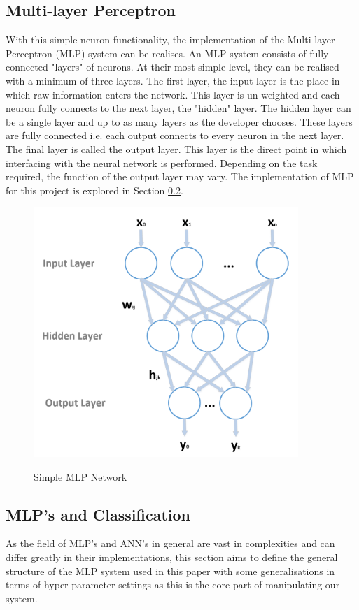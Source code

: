 \documentclass[11pt]{article}
\begin{document}
	\subsection{Multi-layer Perceptron}
	With this simple neuron functionality, the implementation of the Multi-layer Perceptron (MLP) system can be realises. An MLP system consists of fully connected "layers" of neurons. At their most simple level, they can be realised with a minimum of three layers. The first layer, the input layer is the place in which raw information enters the network. This layer is un-weighted and each neuron fully connects to the next layer, the "hidden" layer. The hidden layer can be a single layer and up to as many layers as the developer chooses. These layers are fully connected i.e. each output connects to every neuron in the next layer. The final layer is called the output layer. This layer is the direct point in which interfacing with the neural network is performed. Depending on the task required, the function of the output layer may vary. The implementation of MLP for this project is explored in Section \ref{sec:mlp_class}.
	
	\begin{figure}[H]
		\centering
		\includegraphics[width=10cm]{Figures/mlp}
		\caption{Simple MLP Network}\cite{Bonaccorso2017}
		\label{fig:mlp}
	\end{figure}
	
	\subsection{MLP's and Classification}\label{sec:mlp_class}
	As the field of MLP's and ANN's in general are vast in complexities and can differ greatly in their implementations, this section aims to define the general structure of the MLP system used in this paper with some generalisations in terms of hyper-parameter settings as this is the core part of manipulating our system.\\
	
\end{document}
